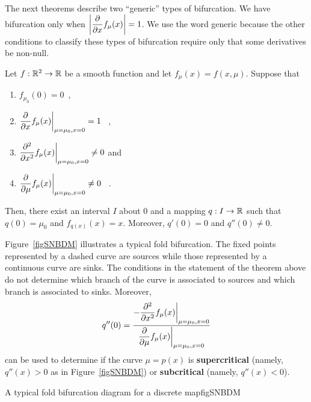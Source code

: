 
The next theorems describe two ``generic'' types of bifurcation.  We
have bifurcation only when
$\displaystyle \left| \pdfdx{f_{\mu}(x)}{x}\right| = 1$.  We use the
word generic because the other conditions to classify these types of
bifurcation require only that some derivatives be non-null.

\begin{theorem}
Let $f:\RR^2 \rightarrow \RR$ be a smooth function and let
$f_\mu(x)= f(x,\mu)$.  Suppose that
\begin{enumerate}
\item $\displaystyle f_{\mu_0}(0)=0$\ ,
\item $\displaystyle \pdfdx{f_{\mu}(x)}{x}\bigg|_{\mu=\mu_0,x=0} = 1$ \ ,
\item $\displaystyle \pdfdxn{f_{\mu}(x)}{x}{2}\bigg|_{\mu=\mu_0,x=0} \neq 0$
\quad and
\item $\displaystyle \pdfdx{f_\mu(x)}{\mu}\bigg|_{\mu=\mu_0,x=0} \neq 0$ \ .
\end{enumerate}
Then, there exist an interval $I$ about $0$ and a mapping
$q:I\rightarrow \RR$ such that $q(0) = \mu_0$ and $f_{q(x)}(x) = x$.  Moreover,
$q'(0) = 0$ and $q''(0) \neq 0$.
\end{theorem}

Figure~\ref{figSNBDM} illustrates a typical fold bifurcation.  The fixed
points represented by a dashed curve are sources while those
represented by a continuous curve are sinks.  The conditions in the
statement of the theorem above do not determine which branch of the
curve is associated to sources and which branch is associated to
sinks.  Moreover,
\[
q''(0) = \frac{\displaystyle -\pdfdxn{f_{\mu}(x)}{x}{2}\bigg|_{\mu=\mu_0,x=0}}
{\displaystyle \pdfdx{f_{\mu}(x)}{\mu}\bigg|_{\mu=\mu_0,x=0}}
\]
can be used to determine if the curve $\mu=p(x)$ is
{\bfseries supercritical}\label{Supercritical} (namely, $q''(x)>0$ as in
Figure~\ref{figSNBDM}) or {\bfseries subcritical}
(namely, $q''(x)<0$).

{A typical fold bifurcation diagram for a discrete map}{figSNBDM}

